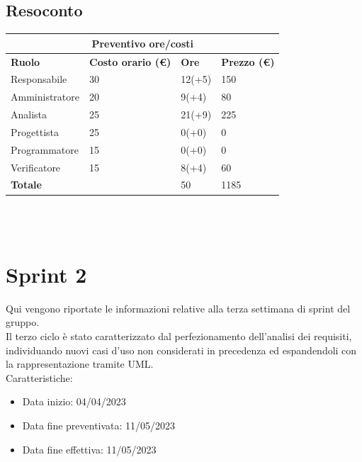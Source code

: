 \documentclass[12pt]{article}
\begin{document}
\subsection{Resoconto}
\begin{center}
    \begin{tabularx}{\textwidth}{|X|X|X|X|}
        \hline
        \multicolumn{4}{|c|}{\textbf{Preventivo ore/costi}}\\
        \hline
        \hline
        \textbf{Ruolo} & \textbf{Costo orario (\euro)} & \textbf{Ore} & \textbf{Prezzo (\euro)}\\
        \hline
        Responsabile    & 30 & 12(+5)  & 150\\
        \hline
        Amministratore  & 20 & 9(+4)  & 80\\
        \hline
        Analista        & 25 & 21(+9)  & 225\\
        \hline
        Progettista     & 25 & 0(+0)  & 0\\
        \hline
        Programmatore   & 15 & 0(+0)  & 0\\
        \hline
        Verificatore    & 15 & 8(+4)  & 60\\
        \hline
        \hline
        \textbf{Totale} &    & 50 &  1185 \\
        \hline
    \end{tabularx}\\[8pt]
    \mbox{}\\
\end{center}


\section{Sprint 2}
Qui vengono riportate le informazioni relative alla terza settimana di sprint del gruppo. \\
Il terzo ciclo è stato caratterizzato dal perfezionamento dell'analisi dei requisiti, individuando nuovi casi d'uso non considerati in precedenza ed espandendoli con la rappresentazione tramite UML.\\



Caratteristiche:
\begin{itemize}
    \item Data inizio: 04/04/2023
    \item Data fine preventivata: 11/05/2023
    \item Data fine effettiva: 11/05/2023
\end{itemize}
\end{document}
